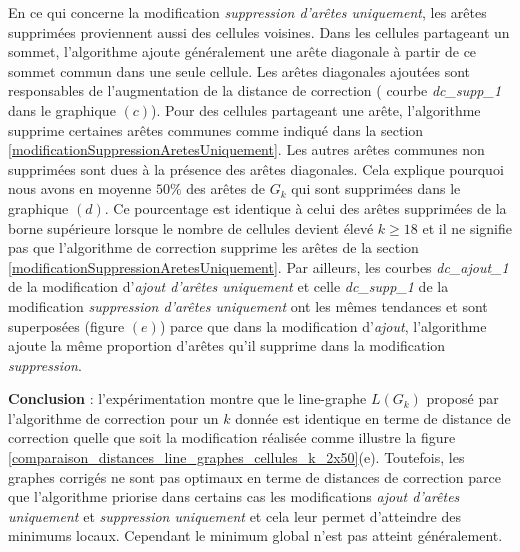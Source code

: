 \newline
En ce qui concerne la modification {\em suppression d'ar\^etes uniquement}, les ar\^etes supprim\'ees proviennent aussi des cellules voisines. 
Dans les cellules partageant un sommet, l'algorithme ajoute g\'en\'eralement une ar\^ete diagonale \`a partir de ce sommet commun dans une seule cellule. Les ar\^etes diagonales ajout\'ees sont responsables de l'augmentation de la distance de correction ( courbe {\em dc\_supp\_1} dans le graphique $(c)$).
Pour des cellules partageant une ar\^ete, l'algorithme supprime certaines ar\^etes communes comme indiqu\'e dans la section \ref{modificationSuppressionAretesUniquement}. Les autres ar\^etes communes non supprim\'ees sont dues \`a la pr\'esence des ar\^etes diagonales. Cela explique pourquoi nous avons en moyenne $50\%$ des ar\^etes de $G_k$ qui sont supprim\'ees dans le graphique $(d)$. Ce pourcentage est identique \`a celui des ar\^etes supprim\'ees de la borne sup\'erieure lorsque le nombre de cellules devient \'elev\'e $k \ge 18$ et il ne signifie pas que l'algorithme de correction supprime les ar\^etes de la section \ref{modificationSuppressionAretesUniquement}.
\newline
Par ailleurs, les courbes {\em dc\_ajout\_1} de la modification d'{\em ajout d'ar\^etes uniquement} et celle {\em dc\_supp\_1}  de la modification {\em suppression d'ar\^etes uniquement} ont les m\^emes tendances et sont superpos\'ees (figure $(e)$) parce que  dans la modification d'{\em ajout}, l'algorithme ajoute la m\^eme proportion d'ar\^etes qu'il supprime dans  la modification {\em suppression}. 
\newline

\vspace{-0.25cm}
{\bf Conclusion} :   
l'exp\'erimentation montre que le line-graphe $L(G_k)$ propos\'e par l'algorithme de correction pour un $k$ donn\'ee est identique en terme de distance de correction quelle que soit la modification r\'ealis\'ee comme illustre la figure \ref{comparaison_distances_line_graphes_cellules_k_2x50}(e).
Toutefois, les graphes corrig\'es ne sont pas optimaux en terme de distances de correction parce que l'algorithme priorise dans certains cas les modifications {\em ajout d'ar\^etes uniquement} et {\em suppression uniquement} et cela leur permet d'atteindre des minimums locaux. Cependant le minimum global n'est pas atteint g\'en\'eralement. 

